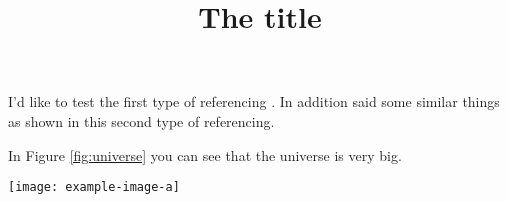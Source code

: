 \documentclass[twocolumn]{article}
\title{The title}
\author{}
\date{}
\begin{document}
\maketitle

%
%

\blinddocument

I'd like to test the first type of referencing \citep{adams1995hitchhiker}. In addition \citet{adams1995hitchhiker} said some similar things as shown in this second type of referencing. 

In Figure \ref{fig:universe} you can see that the universe is very big.

\begin{figure*}[t]
  \centering
  \texttt{[image: example-image-a]}
  \caption{\blindtext}
  \label{fig:universe}
\end{figure*}


\end{document}
